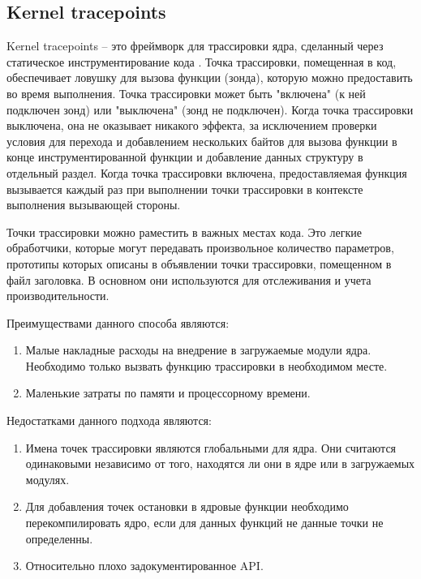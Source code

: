 	\subsection*{Kernel tracepoints}
		Kernel tracepoints -- это фреймворк для трассировки ядра, 
		сделанный через статическое инструментирование кода \cite{linux-kernel-tracepoints}.
		Точка трассировки, помещенная в код, обеспечивает ловушку для вызова функции (зонда),
		которую можно предоставить во время выполнения. 
		Точка трассировки может быть "включена" (к ней подключен зонд) или "выключена" (зонд не подключен).
		Когда точка трассировки выключена, она не оказывает никакого эффекта, 
		за исключением проверки условия для перехода и добавлением нескольких байтов для вызова функции 
		в конце инструментированной функции и добавление данных структуру в отдельный раздел.
		Когда точка трассировки включена, предоставляемая функция вызывается каждый раз при выполнении точки трассировки
		в контексте выполнения вызывающей стороны.

		Точки трассировки можно раместить в важных местах кода. 
		Это легкие обработчики, которые могут передавать произвольное количество параметров,
		прототипы которых описаны в объявлении точки трассировки, помещенном в файл заголовка.
		В основном они используются для отслеживания и учета производительности.
		
		Преимуществами данного способа являются:
		\begin{enumerate}
			\item Малые накладные расходы на внедрение в загружаемые модули ядра.
				Необходимо только вызвать функцию трассировки в необходимом месте.

			\item Маленькие затраты по памяти и процессорному времени.
		\end{enumerate}

		Недостатками данного подхода являются:
		\begin{enumerate}
			\item Имена точек трассировки являются глобальными для ядра. 
			Они считаются одинаковыми независимо от того, находятся ли они в ядре или в загружаемых модулях.
			\item Для добавления точек остановки в ядровые функции необходимо перекомпилировать ядро,
			если для данных функций не данные точки не определенны.
			\item Относительно плохо задокументированное API.
		\end{enumerate}
		
